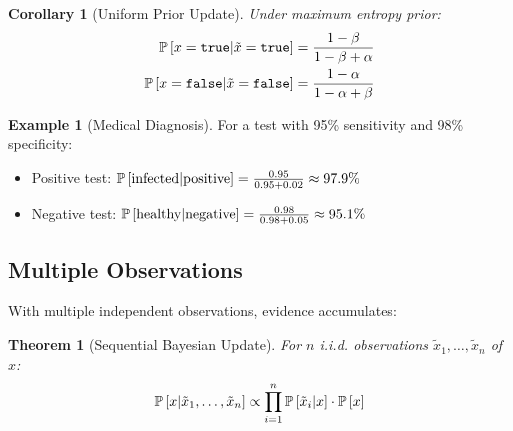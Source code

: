 \documentclass[11pt,twoside,openright]{book}
\theoremstyle{definition}
\newtheorem{example}[definition]{Example}
\theoremstyle{plain}
\newtheorem{theorem}[definition]{Theorem}
\newtheorem{corollary}[definition]{Corollary}
\theoremstyle{remark}
\begin{document}
\begin{corollary}[Uniform Prior Update]
Under maximum entropy prior:
\begin{align}
\mathbb{P}\left[x = \mathtt{true} | \tilde{x} = \mathtt{true}\right] &= \frac{1-\beta}{1-\beta + \alpha} \\
\mathbb{P}\left[x = \mathtt{false} | \tilde{x} = \mathtt{false}\right] &= \frac{1-\alpha}{1-\alpha + \beta}
\end{align}
\end{corollary}

\begin{example}[Medical Diagnosis]
For a test with 95\% sensitivity and 98\% specificity:
\begin{itemize}
    \item Positive test: $\mathbb{P}\left[\text{infected} | \text{positive}\right] = \frac{0.95}{0.95 + 0.02} \approx 97.9\%$
    \item Negative test: $\mathbb{P}\left[\text{healthy} | \text{negative}\right] = \frac{0.98}{0.98 + 0.05} \approx 95.1\%$
\end{itemize}
\end{example}

\subsection{Multiple Observations}

With multiple independent observations, evidence accumulates:

\begin{theorem}[Sequential Bayesian Update]
For $n$ i.i.d. observations $\tilde{x}_1, \ldots, \tilde{x}_n$ of $x$:
\begin{equation}
\mathbb{P}\left[x | \tilde{x}_1, \ldots, \tilde{x}_n\right] \propto \prod_{i=1}^n \mathbb{P}\left[\tilde{x}_i | x\right] \cdot \mathbb{P}\left[x\right]
\end{equation}
\end{theorem}

\begin{algorithm}[H]
\SetAlgoLined
{}
\caption{Bayesian Inference for Bernoulli Booleans}
\end{algorithm}
\end{document}

